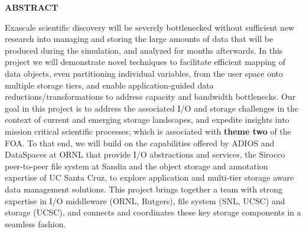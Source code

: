 \vspace{-\belowdisplayskip}
\vspace{-\abovedisplayskip}
\medskip

\begin{center}
\textbf{ABSTRACT}
\end{center}

\vspace{-\belowdisplayskip}

\enlargethispage{2\baselineskip}
Exascale scientific discovery will be
severely bottlenecked without sufficient new research into managing and
storing the large amounts of data that will be produced during the
simulation, and analyzed for months afterwards. In this project we will
demonstrate novel techniques to  facilitate efficient mapping of data
objects, even partitioning individual variables, from
the user space onto multiple storage tiers, and enable application-guided
data reductions/transformations to address capacity and bandwidth
bottlenecks. 
Our goal in this project is
to address the associated I/O and storage challenges in the context of
current and emerging storage landscapes, and expedite insights into mission
critical scientific processes; which is associated with {\bf theme two} of the FOA. To that end, we will build on the
capabilities offered by ADIOS and DataSpaces at ORNL that provide I/O abstractions
and services, the Sirocco peer-to-peer file system at
Sandia and the object storage and annotation expertise of UC Santa Cruz, to
explore application and multi-tier storage aware data management
solutions.    This project
brings together a  team with strong expertise in I/O middleware (ORNL, Rutgers), file system (SNL, UCSC) and storage (UCSC), and connects and
coordinates these key storage components in a seamless fashion.


